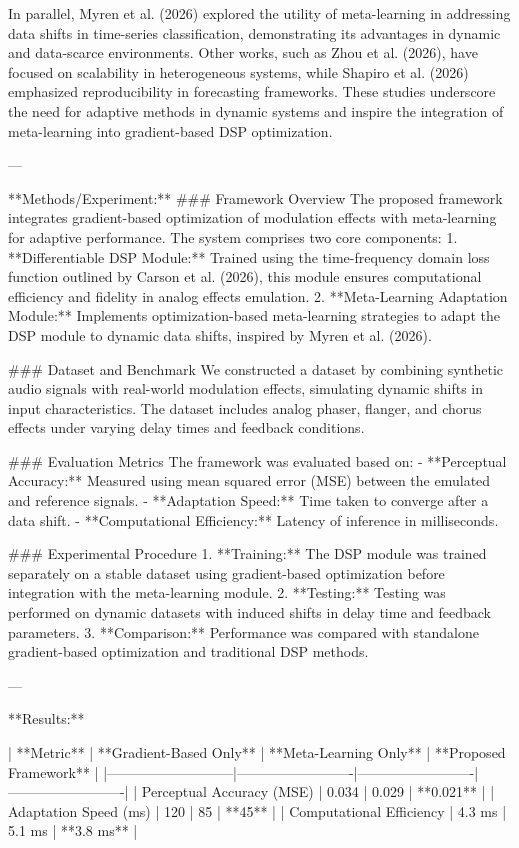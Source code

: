 In parallel, Myren et al. (2026) explored the utility of meta-learning in addressing data shifts in time-series classification, demonstrating its advantages in dynamic and data-scarce environments. Other works, such as Zhou et al. (2026), have focused on scalability in heterogeneous systems, while Shapiro et al. (2026) emphasized reproducibility in forecasting frameworks. These studies underscore the need for adaptive methods in dynamic systems and inspire the integration of meta-learning into gradient-based DSP optimization.

---

**Methods/Experiment:**  
### Framework Overview  
The proposed framework integrates gradient-based optimization of modulation effects with meta-learning for adaptive performance. The system comprises two core components:  
1. **Differentiable DSP Module:** Trained using the time-frequency domain loss function outlined by Carson et al. (2026), this module ensures computational efficiency and fidelity in analog effects emulation.  
2. **Meta-Learning Adaptation Module:** Implements optimization-based meta-learning strategies to adapt the DSP module to dynamic data shifts, inspired by Myren et al. (2026).  

### Dataset and Benchmark  
We constructed a dataset by combining synthetic audio signals with real-world modulation effects, simulating dynamic shifts in input characteristics. The dataset includes analog phaser, flanger, and chorus effects under varying delay times and feedback conditions.

### Evaluation Metrics  
The framework was evaluated based on:  
- **Perceptual Accuracy:** Measured using mean squared error (MSE) between the emulated and reference signals.  
- **Adaptation Speed:** Time taken to converge after a data shift.  
- **Computational Efficiency:** Latency of inference in milliseconds.

### Experimental Procedure  
1. **Training:** The DSP module was trained separately on a stable dataset using gradient-based optimization before integration with the meta-learning module.  
2. **Testing:** Testing was performed on dynamic datasets with induced shifts in delay time and feedback parameters.  
3. **Comparison:** Performance was compared with standalone gradient-based optimization and traditional DSP methods.

---

**Results:**  

| **Metric**               | **Gradient-Based Only** | **Meta-Learning Only** | **Proposed Framework** |  
|---------------------------|-------------------------|-------------------------|-------------------------|  
| Perceptual Accuracy (MSE) | 0.034                  | 0.029                  | **0.021**              |  
| Adaptation Speed (ms)     | 120                    | 85                     | **45**                 |  
| Computational Efficiency  | 4.3 ms                 | 5.1 ms                 | **3.8 ms**             |  

